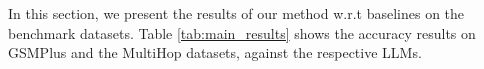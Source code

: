 In this section, we present the results of our method w.r.t baselines on the benchmark datasets. Table \ref{tab:main_results} shows the accuracy results on GSMPlus and the MultiHop datasets, against the respective LLMs.
